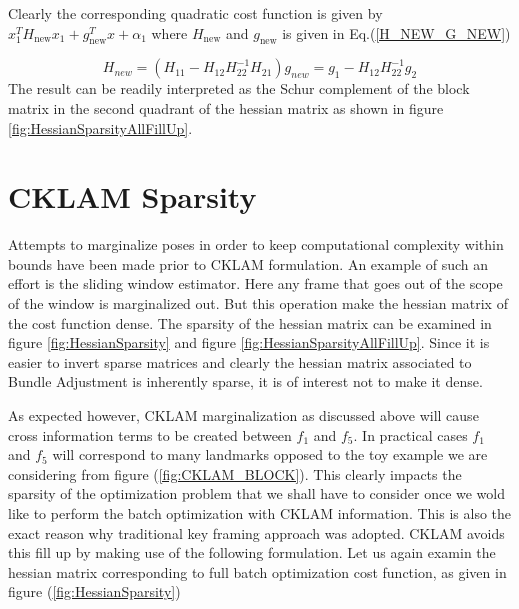 Clearly the corresponding quadratic cost function is given by $x_1^TH_\mathrm{new}x_1 + g_\mathrm{new}^Tx + \alpha_1$ where $H_\mathrm{new}$ and $g_\mathrm{new}$ is given in Eq.(\ref{H_NEW_G_NEW})

\begin{subequations}
	\begin{equation}
		H_{new} = \left(H_{11} - H_{12}H_{22}^{-1}H_{21}\right)
	\end{equation}

	\begin{equation}
		g_{new} = g_1 - H_{12}H_{22}^{-1}g_2
	\end{equation}
	\label{H_NEW_G_NEW}
\end{subequations}
The result can be readily interpreted as the Schur complement of the block matrix in the second quadrant of the hessian matrix as shown in figure \ref{fig:HessianSparsityAllFillUp}.

\section{CKLAM Sparsity}
Attempts to marginalize poses in order to keep computational complexity within bounds have been made prior to CKLAM formulation. An example of such an effort is the sliding window estimator. Here any frame that goes out of the scope of the window is marginalized out. But this operation make the hessian matrix of the cost function dense. The sparsity of the hessian matrix can be examined in figure \ref{fig:HessianSparsity} and figure \ref{fig:HessianSparsityAllFillUp}. Since it is easier to invert sparse matrices and clearly the hessian matrix associated to Bundle Adjustment is inherently sparse, it is of interest not to make it dense.

As expected however, CKLAM marginalization as discussed above will cause cross information terms to be created between $f_1$ and $f_5$. In practical cases $f_1$ and $f_5$ will correspond to many landmarks opposed to the toy example we are considering from figure (\ref{fig:CKLAM_BLOCK}). This clearly impacts the sparsity of the optimization problem that we shall have to consider once we wold like to perform the batch optimization with CKLAM information. This is also the exact reason why traditional key framing approach was adopted. CKLAM avoids this fill up by making use of the following formulation. Let us again examin the hessian matrix corresponding to full batch optimization cost function, as given in figure (\ref{fig:HessianSparsity})

